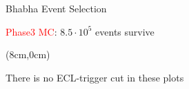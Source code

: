 \documentclass[8pt]{beamer}
\begin{document}
\begin{frame}{Bhabha Event Selection}
\begin{textblock*}{8cm}
		\textcolor{red}{Phase3 MC}: $8.5\cdot 10^5$ events survive
		

		

	\end{textblock*}
	\pause[1]
	\begin{textblock*}{3.5cm}(8cm,0cm)
		\begin{mybox}
		\footnotesize{	There is no ECL-trigger cut in these plots
}		\end{mybox}
	\end{textblock*}
	
	
	

	
\end{frame}
\end{document}
